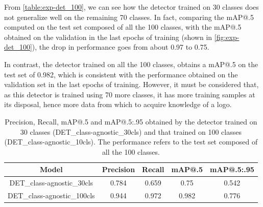 From \autoref{table:exp-det_100}, we can see how the detector trained on 30 classes does not generalize well on the remaining 70 classes.
In fact, comparing the mAP@.5 computed on the test set composed of all the 100 classes, with the mAP@.5 obtained on the validation in the last epochs of training (shown in \autoref{fig:exp-det_100}), the drop in performance goes from about 0.97 to 0.75.

In contrast, the detector trained on all the 100 classes, obtains a mAP@.5 on the test set of 0.982, which is consistent with the performance obtained on the validation set in the last epochs of training.
However, it must be considered that, as this detector is trained using 70 more classes, it has more training samples at its disposal, hence more data from which to acquire knowledge of a logo.


\begin{table}[H]
    \centering
    \begin{tabular}{c|c|c|c|c}
        \hline
        \textbf{Model} &
        \textbf{Precision} &
        \textbf{Recall} &
        \textbf{mAP@.5} &
        \textbf{mAP@.5:.95} \\
        \hline
        \hline
DET\_class-agnostic\_30cls&0.784&0.659&0.75&0.542\\
DET\_class-agnostic\_100cls&0.944&0.972&0.982&0.776\\
\hline
\end{tabular}
\caption{Precision, Recall, mAP@.5 and mAP@.5:.95 obtained by the detector trained on 30 classes (DET\_class-agnostic\_30cls) and that trained on 100 classes (DET\_class-agnostic\_10cls). The performance refers to the test set composed of all the 100 classes.}
    \label{table:exp-det_100}
\end{table}
\newpage

